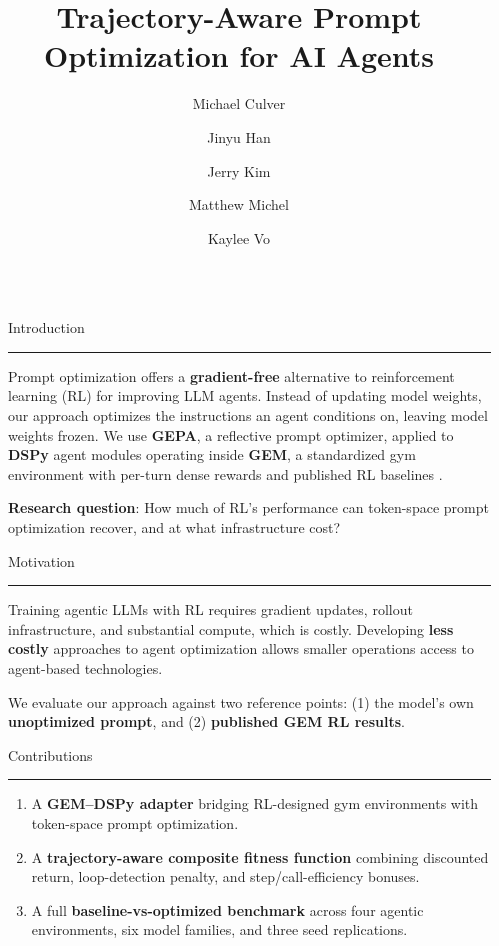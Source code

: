 \documentclass[final]{beamer}
\title{Trajectory-Aware Prompt Optimization for AI Agents}
\author{Michael Culver \and Jinyu Han \and Jerry Kim \and Matthew Michel \and Kaylee Vo}
\institute[shortinst]{Harvard Extension School - Harvard University}
\newcommand{\blockrule}{\vspace{-1.5em}\textcolor{harvardcrimson}{\rule{\linewidth}{1.2pt}}\vspace{-0.2em}}
\newlength{\sepwidth}
\newlength{\colwidth}
\newcommand{\separatorcolumn}{\begin{column}{\sepwidth}\end{column}}
\begin{document}
\begin{frame}[t]
\begin{columns}[t]
\separatorcolumn

\begin{column}{\colwidth}

  \begin{block}{Introduction}
  \blockrule

    Prompt optimization offers a \textbf{gradient-free} alternative to reinforcement learning (RL) for improving LLM agents. Instead of updating model weights, our approach optimizes the instructions an agent conditions on, leaving model weights frozen. We use \textbf{GEPA}, a reflective prompt optimizer, applied to \textbf{DSPy} agent modules operating inside \textbf{GEM}, a standardized gym environment with per-turn dense rewards and published RL baselines \cite{gem2025}.

    \textbf{Research question}: How much of RL's performance can token-space prompt optimization recover, and at what infrastructure cost?

  \end{block}
    \vspace{-0.5em}
  \begin{block}{Motivation}
    \blockrule
    
    Training agentic LLMs with RL requires gradient updates, rollout infrastructure, and substantial compute, which is costly. Developing \textbf{less costly} approaches to agent optimization allows smaller operations access to agent-based technologies. 

    We evaluate our approach against two reference points: (1) the model's own \textbf{unoptimized prompt}, and (2) \textbf{published GEM RL results}.
  \end{block}
  \begin{alertblock}{Contributions}
  \blockrule
    \begin{enumerate}
      \item A \textbf{GEM--DSPy adapter} bridging RL-designed gym environments with token-space prompt optimization.
      \item A \textbf{trajectory-aware composite fitness function} combining discounted return, loop-detection penalty, and step/call-efficiency bonuses.
      \item A full \textbf{baseline-vs-optimized benchmark} across four agentic environments, six model families, and three seed replications.
    \end{enumerate}
  \end{alertblock}
    \vspace{-1em}
    

\end{column}
\end{columns}
\end{frame}
\end{document}
